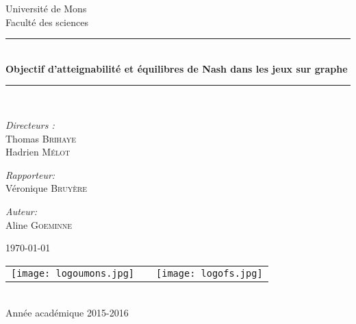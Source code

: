 \documentclass[]{article}
\begin{document}
\begin{titlepage}
\begin{center}

{\Large Université de Mons}\\[1ex]
{\Large Faculté des sciences}\\[2.5cm]

\newcommand{\HRule}{\rule{\linewidth}{0.3mm}}
\HRule \\[0.3cm]
{ \LARGE \bfseries Objectif d'atteignabilité et équilibres de Nash dans les jeux sur graphe \\[0.3cm]}
\HRule \\[1.5cm]


\begin{center}
	\emph{Directeurs :}\\
	 Thomas \textsc{Brihaye} \\
	 Hadrien \textsc{Mélot}

\end{center}

\begin{center}
	\emph{Rapporteur:}\\
	Véronique \textsc{Bruyère}
\end{center}

\begin{center}
\emph{Auteur:} \\
Aline \textsc{Goeminne}
\end{center}
\vfill
\today
\vfill

\begin{center}
\begin{tabular}[t]{c c c}
\texttt{[image: logoumons.jpg]} &
\hspace{0.3cm} &
\texttt{[image: logofs.jpg]}
\end{tabular}
\end{center}~\\

{\large Année académique 2015-2016}

\end{center}
\end{titlepage}

\tableofcontents
\newpage


%
\newpage

\newpage

\newpage

\newpage





\newpage




\end{document}
